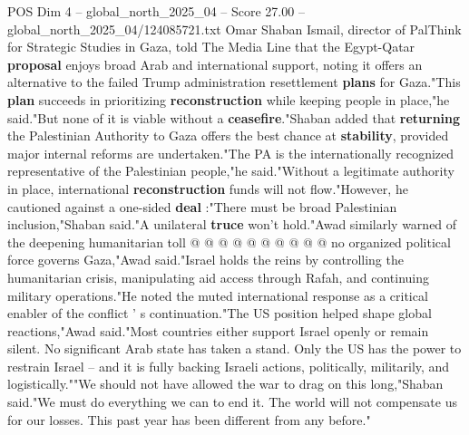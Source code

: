 \begin{textsample}{POS Dim 4 – global\_north\_2025\_04 – Score 27.00 – global\_north\_2025\_04/124085721.txt}
Omar Shaban Ismail, director of PalThink for Strategic Studies in Gaza, told The Media Line that the Egypt-Qatar \textbf{proposal} enjoys broad Arab and international support, noting it offers an alternative to the failed Trump administration resettlement \textbf{plans} for Gaza."This \textbf{plan} succeeds in prioritizing \textbf{reconstruction} while keeping people in place,"he said."But none of it is viable without a \textbf{ceasefire}."Shaban added that \textbf{returning} the Palestinian Authority to Gaza offers the best chance at \textbf{stability}, provided major internal reforms are undertaken."The PA is the internationally recognized representative of the Palestinian people,"he said."Without a legitimate authority in place, international \textbf{reconstruction} funds will not flow."However, he cautioned against a one-sided \textbf{deal} :"There must be broad Palestinian inclusion,"Shaban said."A unilateral \textbf{truce} won't hold."Awad similarly warned of the deepening humanitarian toll @ @ @ @ @ @ @ @ @ @ no organized political force governs Gaza,"Awad said."Israel holds the reins by controlling the humanitarian crisis, manipulating aid access through Rafah, and continuing military operations."He noted the muted international response as a critical enabler of the conflict ' s continuation."The US position helped shape global reactions,"Awad said."Most countries either support Israel openly or remain silent.
No significant Arab state has taken a stand.
Only the US has the power to restrain Israel -- and it is fully backing Israeli actions, politically, militarily, and logistically.""We should not have allowed the war to drag on this long,"Shaban said."We must do everything we can to end it.
The world will not compensate us for our losses.
This past year has been different from any before."

\end{textsample}
